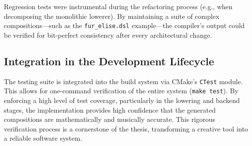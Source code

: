 Regression tests were instrumental during the refactoring process (e.g., when decomposing the monolithic lowerer).
By maintaining a suite of complex compositions—such as the \texttt{fur\_elise.dsl} example—the compiler's output could be verified for bit-perfect consistency after every architectural change.

\subsection{Integration in the Development Lifecycle}

The testing suite is integrated into the build system via CMake's \texttt{CTest} module.
This allows for one-command verification of the entire system (\texttt{make test}).
By enforcing a high level of test coverage, particularly in the lowering and backend stages, the implementation provides high confidence that the generated compositions are mathematically and musically accurate.
This rigorous verification process is a cornerstone of the thesis, transforming a creative tool into a reliable software system.
